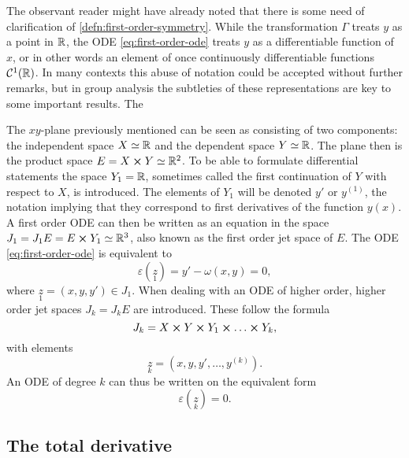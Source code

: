 The observant reader might have already noted that there is some need of clarification of \cref{defn:first-order-symmetry}.
While the transformation \(\Gamma\) treats \(y\) as a point in \(\mathbb{R}\), the ODE \ref{eq:first-order-ode} treats \(y\) as a differentiable function of \(x\), or in other words an element of once continuously differentiable functions \(\mathcal{C}^1(\mathbb{R})\).
In many contexts this abuse of notation could be accepted without further remarks, but in group analysis the subtleties of these representations are key to some important results.
The 

The \(xy\)-plane previously mentioned can be seen as consisting of two components: the independent space \(X \simeq \mathbb{R}\) and the dependent space \(Y \simeq \mathbb{R}\).
The plane then is the product space \(E = X \cross Y \simeq \mathbb{R}^2\).
To be able to formulate differential statements the space \(Y_1 = \mathbb{R}\), sometimes called the first continuation of \(Y\) with respect to \(X\), is introduced.
The elements of \(Y_1\) will be denoted \(y'\) or \(y^{(1)}\), the notation implying that they correspond to first derivatives of the function \(y(x)\).
A first order ODE can then be written as an equation in the space \(J_1 = J_1 E = E \cross Y_1 \simeq \mathbb{R}^3\), also known as the first order jet space of \(E\).
The ODE \ref{eq:first-order-ode} is equivalent to
\begin{equation} \label{eq:first-order-jet-ode}
  \varepsilon(\underset{1}{z}) = y' - \omega(x,y) = 0,
\end{equation}
where \(\underset{1}{z} = (x,y,y') \in J_1\).
When dealing with an ODE of higher order, higher order jet spaces \(J_k = J_k E\) are introduced.
These follow the formula
\begin{equation}
  J_k = X \cross Y \cross Y_1 \cross \dots \cross Y_k,
\end{equation}
with elements
\begin{equation}
  \underset{k}{z} = (x, y, y', \dots, y^{(k)}).
\end{equation}
An ODE of degree \(k\) can thus be written on the equivalent form
\begin{equation}
  \varepsilon(\underset{k}{z}) = 0.
\end{equation}

\subsection{The total derivative}

